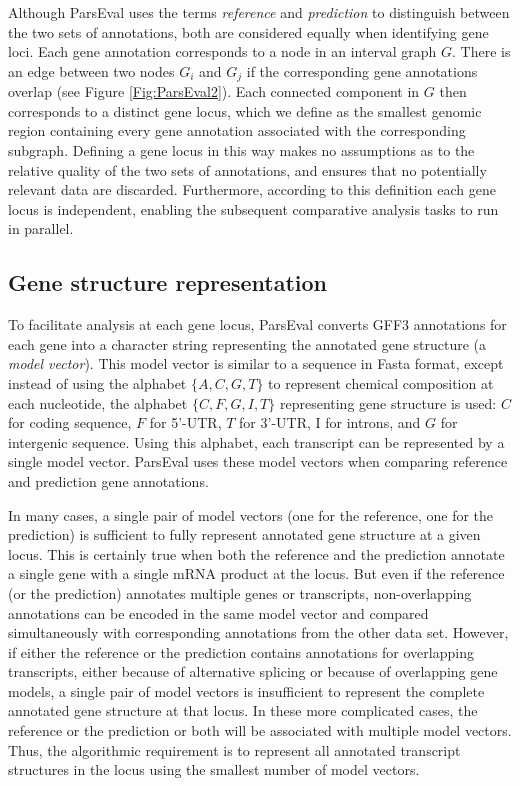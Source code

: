 Although ParsEval uses the terms \emph{reference} and \emph{prediction} to distinguish between the two sets of annotations, both are considered equally when identifying gene loci.
Each gene annotation corresponds to a node in an interval graph $G$.
There is an edge between two nodes $G_i$ and $G_j$ if the corresponding gene annotations overlap (see Figure \ref{Fig:ParsEval2}).
Each connected component in $G$ then corresponds to a distinct gene locus, which we define as the smallest genomic region containing every gene annotation associated with the corresponding subgraph.
Defining a gene locus in this way makes no assumptions as to the relative quality of the two sets of annotations, and ensures that no potentially relevant data are discarded.
Furthermore, according to this definition each gene locus is independent, enabling the subsequent comparative analysis tasks to run in parallel.

\subsection{Gene structure representation}
To facilitate analysis at each gene locus, ParsEval converts GFF3 annotations for each gene into a character string representing the annotated gene structure (a \emph{model vector}).
This model vector is similar to a sequence in Fasta format, except instead of using the alphabet $\{ A, C, G, T \}$ to represent chemical composition at each nucleotide, the alphabet $\{ C, F, G, I, T \}$ representing gene structure is used: $C$ for coding sequence, $F$ for 5'-UTR, $T$ for 3'-UTR, I for introns, and $G$ for intergenic sequence.
Using this alphabet, each transcript can be represented by a single model vector.
ParsEval uses these model vectors when comparing reference and prediction gene annotations.

In many cases, a single pair of model vectors (one for the reference, one for the prediction) is sufficient to fully represent annotated gene structure at a given locus.
This is certainly true when both the reference and the prediction annotate a single gene with a single mRNA product at the locus.
But even if the reference (or the prediction) annotates multiple genes or transcripts, non-overlapping annotations can be encoded in the same model vector and compared simultaneously with corresponding annotations from the other data set.
However, if either the reference or the prediction contains annotations for overlapping transcripts, either because of alternative splicing or because of overlapping gene models, a single pair of model vectors is insufficient to represent the complete annotated gene structure at that locus.
In these more complicated cases, the reference or the prediction or both will be associated with multiple model vectors.
Thus, the algorithmic requirement is to represent all annotated transcript structures in the locus using the smallest number of model vectors.

